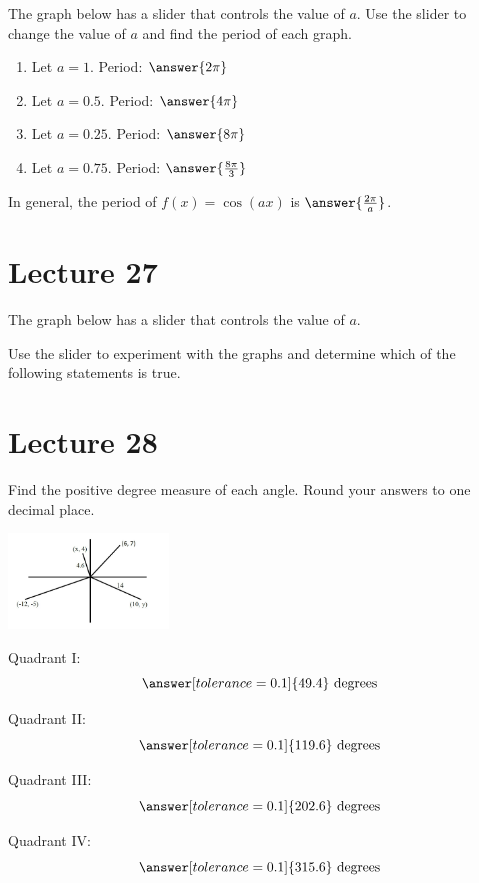 \documentclass{ximera}
\begin{document}
\begin{problem}\label{prob:160hom11prob4}  
 The graph below has a slider that controls the value of $a$.  Use the slider to change the value of $a$ and find the period of each graph.
  \begin{center} 
\end{center}
\begin{enumerate}
    \item Let $a=1$.  Period: $\answer{2\pi}$
    \item Let $a=0.5$.  Period: $\answer{4\pi}$
    \item Let $a=0.25$.  Period: $\answer{8\pi}$
    \item Let $a=0.75$.  Period: $\answer{\frac{8\pi}{3}}$
\end{enumerate}
In general, the period of $f(x)=\cos (ax)$ is $\answer{\frac{2\pi}{a}}$.
\end{problem}

\section{Lecture 27}

\begin{problem}\label{prob:160hom11prob5}  
 The graph below has a slider that controls the value of $a$. 
  \begin{center} 
\end{center}
Use the slider to experiment with the graphs and determine which of the following statements is true.
\begin{multipleChoice}  
\end{multipleChoice}  
\end{problem}  
  
 \section{Lecture 28}
\begin{problem}\label{prob:160hom11prob1}
Find the positive degree measure of each angle. Round your answers to one decimal place.
\begin{image}
   
\includegraphics[height=1in]{160H11pic1.jpg}~
 
\end{image}

Quadrant I:
$$\answer[tolerance=0.1]{49.4}\mbox{ degrees}$$

Quadrant II:
$$\answer[tolerance=0.1]{119.6}\mbox{ degrees}$$

Quadrant III:
$$\answer[tolerance=0.1]{202.6}\mbox{ degrees}$$

Quadrant IV:
$$\answer[tolerance=0.1]{315.6}\mbox{ degrees}$$
\end{problem}
\end{document}
